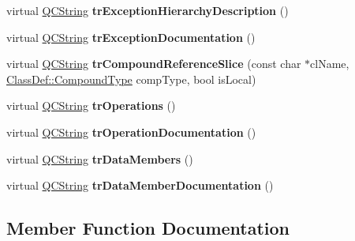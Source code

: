 \begin{DoxyCompactItemize}
\item 
\mbox{\label{class_translator_brazilian_aa04d9c0045a2e3b0bad416dd22d023fe}} 
virtual \mbox{\hyperlink{class_q_c_string}{Q\+C\+String}} {\bfseries tr\+Exception\+Hierarchy\+Description} ()
\item 
\mbox{\label{class_translator_brazilian_a71e95bcccc4131874c5c01f2fbe8aad9}} 
virtual \mbox{\hyperlink{class_q_c_string}{Q\+C\+String}} {\bfseries tr\+Exception\+Documentation} ()
\item 
\mbox{\label{class_translator_brazilian_a859b9d1359ad2c7c01f5d55df14b1f72}} 
virtual \mbox{\hyperlink{class_q_c_string}{Q\+C\+String}} {\bfseries tr\+Compound\+Reference\+Slice} (const char $\ast$cl\+Name, \mbox{\hyperlink{class_class_def_ae70cf86d35fe954a94c566fbcfc87939}{Class\+Def\+::\+Compound\+Type}} comp\+Type, bool is\+Local)
\item 
\mbox{\label{class_translator_brazilian_a047ef6f16e02ee977df9cddbfcffead6}} 
virtual \mbox{\hyperlink{class_q_c_string}{Q\+C\+String}} {\bfseries tr\+Operations} ()
\item 
\mbox{\label{class_translator_brazilian_a523dc6ec360ac29ae7dbd4dd9c5f6ee1}} 
virtual \mbox{\hyperlink{class_q_c_string}{Q\+C\+String}} {\bfseries tr\+Operation\+Documentation} ()
\item 
\mbox{\label{class_translator_brazilian_a9da5fc763de8219e4d06054ef6dae9ac}} 
virtual \mbox{\hyperlink{class_q_c_string}{Q\+C\+String}} {\bfseries tr\+Data\+Members} ()
\item 
\mbox{\label{class_translator_brazilian_a6cf6abee6e52caa42139e2852aa58fac}} 
virtual \mbox{\hyperlink{class_q_c_string}{Q\+C\+String}} {\bfseries tr\+Data\+Member\+Documentation} ()
\end{DoxyCompactItemize}


\subsection{Member Function Documentation}
\mbox{\label{class_translator_brazilian_a99a04792e8ebc99971ddea38f6b88968}} 
